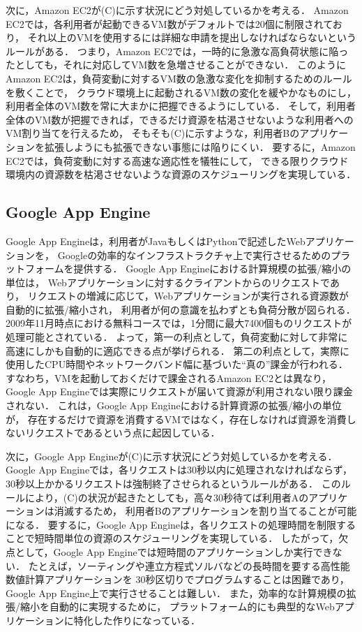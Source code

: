 \documentclass[10pt]{jsarticle}
\begin{document}
次に，Amazon EC2が(C)に示す状況にどう対処しているかを考える．
Amazon EC2では，各利用者が起動できるVM数がデフォルトでは20個に制限されており，
それ以上のVMを使用するには詳細な申請を提出しなければならないというルールがある．
つまり，Amazon EC2では，一時的に急激な高負荷状態に陥ったとしても，それに対応してVM数を急増させることができない．
このようにAmazon EC2は，負荷変動に対するVM数の急激な変化を抑制するためのルールを敷くことで，
クラウド環境上に起動されるVM数の変化を緩やかなものにし，利用者全体のVM数を常に大まかに把握できるようにしている．
そして，利用者全体のVM数が把握できれば，できるだけ資源を枯渇させないような利用者へのVM割り当てを行えるため，
そもそも(C)に示すような，利用者Bのアプリケーションを拡張しようにも拡張できない事態には陥りにくい．
要するに，Amazon EC2では，負荷変動に対する高速な適応性を犠牲にして，
できる限りクラウド環境内の資源数を枯渇させないような資源のスケジューリングを実現している．

\subsection{Google App Engine}

Google App Engineは，利用者がJavaもしくはPythonで記述したWebアプリケーションを，
Googleの効率的なインフラストラクチャ上で実行させるためのプラットフォームを提供する．
Google App Engineにおける計算規模の拡張/縮小の単位は，
Webアプリケーションに対するクライアントからのリクエストであり，
リクエストの増減に応じて，Webアプリケーションが実行される資源数が自動的に拡張/縮小され，
利用者が何の意識を払わずとも負荷分散が図られる．
2009年11月時点における無料コースでは，1分間に最大7400個ものリクエストが処理可能とされている．
よって，第一の利点として，負荷変動に対して非常に高速にしかも自動的に適応できる点が挙げられる．
第二の利点として，実際に使用したCPU時間やネットワークバンド幅に基づいた``真の''課金が行われる．
すなわち，VMを起動しておくだけで課金されるAmazon EC2とは異なり，
Google App Engineでは実際にリクエストが届いて資源が利用されない限り課金されない．
これは，Google App Engineにおける計算資源の拡張/縮小の単位が，
存在するだけで資源を消費するVMではなく，存在しなければ資源を消費しないリクエストであるという点に起因している．

次に，Google App Engineが(C)に示す状況にどう対処しているかを考える．
Google App Engineでは，各リクエストは30秒以内に処理されなければならず，
30秒以上かかるリクエストは強制終了させられるというルールがある．
このルールにより，(C)の状況が起きたとしても，高々30秒待てば利用者Aのアプリケーションは消滅するため，
利用者Bのアプリケーションを割り当てることが可能になる．
要するに，Google App Engineは，各リクエストの処理時間を制限することで短時間単位の資源のスケジューリングを実現している．
したがって，欠点として，Google App Engineでは短時間のアプリケーションしか実行できない．
たとえば，ソーティングや連立方程式ソルバなどの長時間を要する高性能数値計算アプリケーションを
30秒区切りでプログラムすることは困難であり，Google App Engine上で実行させることは難しい．
また，効率的な計算規模の拡張/縮小を自動的に実現するために，
プラットフォーム的にも典型的なWebアプリケーションに特化した作りになっている．
\end{document}
